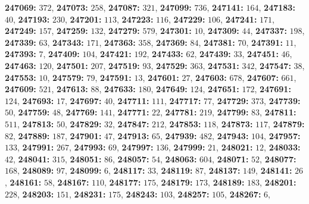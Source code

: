 \textsf{\bfseries 247069:} $372$, \textsf{\bfseries 247073:} $258$, \textsf{\bfseries 247087:} $321$, \textsf{\bfseries 247099:} $736$, \textsf{\bfseries 247141:} $164$, \textsf{\bfseries 247183:} $40$, \textsf{\bfseries 247193:} $230$, \textsf{\bfseries 247201:} $113$, \textsf{\bfseries 247223:} $116$, \textsf{\bfseries 247229:} $106$, \textsf{\bfseries 247241:} $171$, \textsf{\bfseries 247249:} $157$, \textsf{\bfseries 247259:} $132$, \textsf{\bfseries 247279:} $579$, \textsf{\bfseries 247301:} $10$, \textsf{\bfseries 247309:} $44$, \textsf{\bfseries 247337:} $198$, \textsf{\bfseries 247339:} $63$, \textsf{\bfseries 247343:} $171$, \textsf{\bfseries 247363:} $358$, \textsf{\bfseries 247369:} $84$, \textsf{\bfseries 247381:} $70$, \textsf{\bfseries 247391:} $11$, \textsf{\bfseries 247393:} $7$, \textsf{\bfseries 247409:} $104$, \textsf{\bfseries 247421:} $192$, \textsf{\bfseries 247433:} $62$, \textsf{\bfseries 247439:} $33$, \textsf{\bfseries 247451:} $46$, \textsf{\bfseries 247463:} $120$, \textsf{\bfseries 247501:} $207$, \textsf{\bfseries 247519:} $93$, \textsf{\bfseries 247529:} $363$, \textsf{\bfseries 247531:} $342$, \textsf{\bfseries 247547:} $38$, \textsf{\bfseries 247553:} $10$, \textsf{\bfseries 247579:} $79$, \textsf{\bfseries 247591:} $13$, \textsf{\bfseries 247601:} $27$, \textsf{\bfseries 247603:} $678$, \textsf{\bfseries 247607:} $661$, \textsf{\bfseries 247609:} $521$, \textsf{\bfseries 247613:} $88$, \textsf{\bfseries 247633:} $180$, \textsf{\bfseries 247649:} $124$, \textsf{\bfseries 247651:} $172$, \textsf{\bfseries 247691:} $124$, \textsf{\bfseries 247693:} $17$, \textsf{\bfseries 247697:} $40$, \textsf{\bfseries 247711:} $111$, \textsf{\bfseries 247717:} $77$, \textsf{\bfseries 247729:} $373$, \textsf{\bfseries 247739:} $50$, \textsf{\bfseries 247759:} $48$, \textsf{\bfseries 247769:} $141$, \textsf{\bfseries 247771:} $22$, \textsf{\bfseries 247781:} $219$, \textsf{\bfseries 247799:} $83$, \textsf{\bfseries 247811:} $511$, \textsf{\bfseries 247813:} $50$, \textsf{\bfseries 247829:} $32$, \textsf{\bfseries 247847:} $212$, \textsf{\bfseries 247853:} $118$, \textsf{\bfseries 247873:} $117$, \textsf{\bfseries 247879:} $82$, \textsf{\bfseries 247889:} $187$, \textsf{\bfseries 247901:} $47$, \textsf{\bfseries 247913:} $65$, \textsf{\bfseries 247939:} $482$, \textsf{\bfseries 247943:} $104$, \textsf{\bfseries 247957:} $133$, \textsf{\bfseries 247991:} $267$, \textsf{\bfseries 247993:} $69$, \textsf{\bfseries 247997:} $136$, \textsf{\bfseries 247999:} $21$, \textsf{\bfseries 248021:} $12$, \textsf{\bfseries 248033:} $42$, \textsf{\bfseries 248041:} $315$, \textsf{\bfseries 248051:} $86$, \textsf{\bfseries 248057:} $54$, \textsf{\bfseries 248063:} $604$, \textsf{\bfseries 248071:} $52$, \textsf{\bfseries 248077:} $168$, \textsf{\bfseries 248089:} $97$, \textsf{\bfseries 248099:} $6$, \textsf{\bfseries 248117:} $33$, \textsf{\bfseries 248119:} $87$, \textsf{\bfseries 248137:} $149$, \textsf{\bfseries 248141:} $26$, \textsf{\bfseries 248161:} $58$, \textsf{\bfseries 248167:} $110$, \textsf{\bfseries 248177:} $175$, \textsf{\bfseries 248179:} $173$, \textsf{\bfseries 248189:} $183$, \textsf{\bfseries 248201:} $228$, \textsf{\bfseries 248203:} $151$, \textsf{\bfseries 248231:} $175$, \textsf{\bfseries 248243:} $103$, \textsf{\bfseries 248257:} $105$, \textsf{\bfseries 248267:} $6$, 
